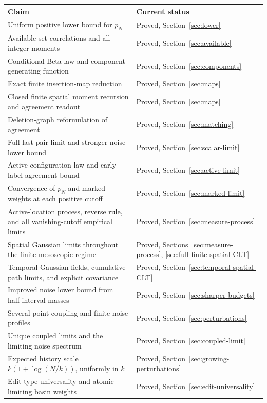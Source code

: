 \documentclass[11pt,letterpaper]{article}
\begin{document}
\begin{center}
\begin{tabular}{p{}p{}}
\toprule
Claim & Current status\\\midrule
Uniform positive lower bound for $p_N$ & Proved, Section~\ref{sec:lower}\\
Available-set correlations and all integer moments & Proved, Section~\ref{sec:available}\\
Conditional Beta law and component generating function & Proved, Section~\ref{sec:components}\\
Exact finite insertion-map reduction & Proved, Section~\ref{sec:maps}\\
Closed finite spatial moment recursion and agreement readout & Proved, Section~\ref{sec:maps}\\
Deletion-graph reformulation of agreement & Proved, Section~\ref{sec:matching}\\
Full last-pair limit and stronger noise lower bound & Proved, Section~\ref{sec:scalar-limit}\\
Active configuration law and early-label agreement bound & Proved, Section~\ref{sec:active-limit}\\
Convergence of $p_N$ and marked weights at each positive cutoff & Proved, Section~\ref{sec:marked-limit}\\
Active-location process, reverse rule, and all vanishing-cutoff empirical limits & Proved, Section~\ref{sec:measure-process}\\
Spatial Gaussian limits throughout the finite mesoscopic regime & Proved, Sections~\ref{sec:measure-process}, \ref{sec:full-finite-spatial-CLT}\\
Temporal Gaussian fields, cumulative path limits, and explicit covariance & Proved, Section~\ref{sec:temporal-spatial-CLT}\\
Improved noise lower bound from half-interval masses & Proved, Section~\ref{sec:sharper-budgets}\\
Several-point coupling and finite noise profiles & Proved, Section~\ref{sec:perturbations}\\
Unique coupled limits and the limiting noise spectrum & Proved, Section~\ref{sec:coupled-limit}\\
Expected history scale $k(1+\log(N/k))$, uniformly in $k$ & Proved, Section~\ref{sec:growing-perturbations}\\
Edit-type universality and atomic limiting basin weights & Proved, Section~\ref{sec:edit-universality}\\

\end{tabular}
\end{center}
\end{document}
